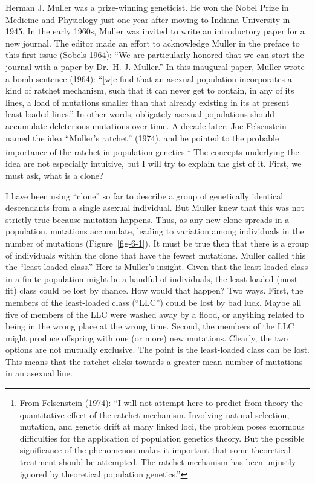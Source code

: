 \documentclass[
  letterpaper,
]{book}
\begin{document}
Herman J. Muller was a prize-winning geneticist. He won the Nobel Prize
in Medicine and Physiology just one year after moving to Indiana
University in 1945. In the early 1960s, Muller was invited to write an
introductory paper for a new journal. The editor made an effort to
acknowledge Muller in the preface to this first issue (Sobels 1964):
``We are particularly honored that we can start the journal with a paper
by Dr.~H. J. Muller.'' In this inaugural paper, Muller wrote a bomb
sentence (1964): ``{[}w{]}e find that an asexual population incorporates
a kind of ratchet mechanism, such that it can never get to contain, in
any of its lines, a load of mutations smaller than that already existing
in its at present least-loaded lines.'' In other words, obligately
asexual populations should accumulate deleterious mutations over time. A
decade later, Joe Felsenstein named the idea ``Muller's ratchet''
(1974), and he pointed to the probable importance of the ratchet in
population genetics.\footnote{From Felsenstein (1974): ``I will not
  attempt here to predict from theory the quantitative effect of the
  ratchet mechanism. Involving natural selection, mutation, and genetic
  drift at many linked loci, the problem poses enormous difficulties for
  the application of population genetics theory. But the possible
  significance of the phenomenon makes it important that some
  theoretical treatment should be attempted. The ratchet mechanism has
  been unjustly ignored by theoretical population genetics.''} The
concepts underlying the idea are not especially intuitive, but I will
try to explain the gist of it. First, we must ask, what is a clone?

I have been using ``clone'' so far to describe a group of genetically
identical descendants from a single asexual individual. But Muller knew
that this was not strictly true because mutation happens. Thus, as any
new clone spreads in a population, mutations accumulate, leading to
variation among individuals in the number of mutations
(Figure~\ref{fig-6-1}). It must be true then that there is a group of
individuals within the clone that have the fewest mutations. Muller
called this the ``least-loaded class.'' Here is Muller's insight. Given
that the least-loaded class in a finite population might be a handful of
individuals, the least-loaded (most fit) class could be lost by chance.
How would that happen? Two ways. First, the members of the least-loaded
class (``LLC'') could be lost by bad luck. Maybe all five of members of
the LLC were washed away by a flood, or anything related to being in the
wrong place at the wrong time. Second, the members of the LLC might
produce offspring with one (or more) new mutations. Clearly, the two
options are not mutually exclusive. The point is the least-loaded class
can be lost. This means that the ratchet clicks towards a greater mean
number of mutations in an asexual line.
\end{document}
